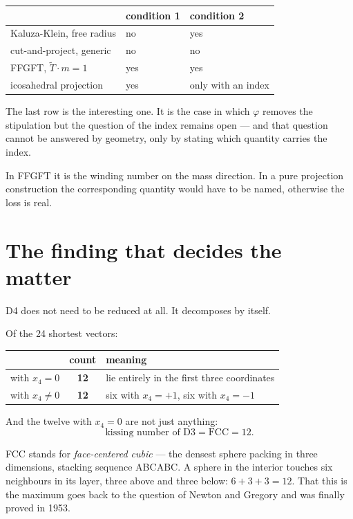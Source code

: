 \documentclass[11pt]{report}
\begin{document}
\begin{center}
\begin{tabular}{lll}
\toprule
 & condition 1 & condition 2 \\
\midrule
Kaluza-Klein, free radius & no & yes \\
cut-and-project, generic & no & no \\
FFGFT, $\tilde T \cdot m = 1$ & yes & yes \\
icosahedral projection & yes & only with an index \\
\bottomrule
\end{tabular}
\end{center}

The last row is the interesting one. It is the case in which $\varphi$
removes the stipulation but the question of the index remains open ---
and that question cannot be answered by geometry, only by stating which
quantity carries the index.

In FFGFT it is the winding number on the mass direction. In a pure
projection construction the corresponding quantity would have to be
named, otherwise the loss is real.

\chapter{The finding that decides the matter}

D4 does not need to be reduced at all. It decomposes by itself.

Of the 24 shortest vectors:
\begin{center}
\begin{tabular}{lcl}
\toprule
 & count & meaning \\
\midrule
with $x_4 = 0$ & \textbf{12} & lie entirely in the first three coordinates \\
with $x_4 \neq 0$ & \textbf{12} & six with $x_4 = +1$, six with $x_4 = -1$ \\
\bottomrule
\end{tabular}
\end{center}

And the twelve with $x_4 = 0$ are not just anything:
\[
  \text{kissing number of D3} = \text{FCC} = 12 .
\]

FCC stands for \emph{face-centered cubic} --- the densest sphere
packing in three dimensions, stacking sequence ABCABC. A sphere in the
interior touches six neighbours in its layer, three above and three
below: $6 + 3 + 3 = 12$. That this is the maximum goes back to the
question of Newton and Gregory and was finally proved in 1953.
\end{document}
